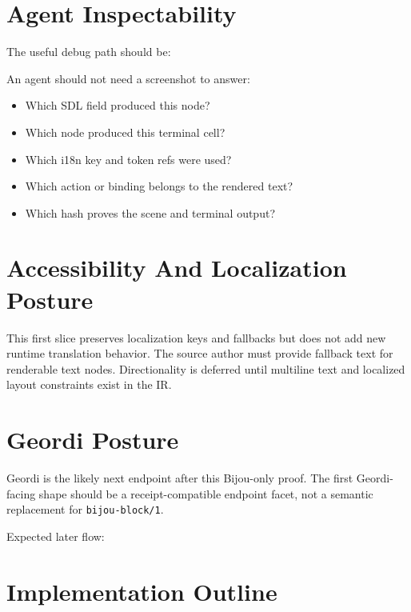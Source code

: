 \section{Agent Inspectability}\label{record-140-agent-inspectability}

The useful debug path should be:



An agent should not need a screenshot to answer:

\begin{itemize}
\tightlist
\item
  Which SDL field produced this node?
\item
  Which node produced this terminal cell?
\item
  Which i18n key and token refs were used?
\item
  Which action or binding belongs to the rendered text?
\item
  Which hash proves the scene and terminal output?
\end{itemize}

\section{Accessibility And Localization Posture}\label{record-140-accessibility-and-localization-posture}

This first slice preserves localization keys and fallbacks but does not add new runtime translation behavior. The source author must provide fallback text for renderable text nodes. Directionality is deferred until multiline text and localized layout constraints exist in the IR.

\section{Geordi Posture}\label{record-140-geordi-posture}

Geordi is the likely next endpoint after this Bijou-only proof. The first Geordi-facing shape should be a receipt-compatible endpoint facet, not a semantic replacement for \texttt{b\allowbreak{}i\allowbreak{}j\allowbreak{}o\allowbreak{}u\allowbreak{}-\allowbreak{}b\allowbreak{}l\allowbreak{}o\allowbreak{}c\allowbreak{}k\allowbreak{}/\allowbreak{}1}.

Expected later flow:



\section{Implementation Outline}\label{record-140-implementation-outline}

